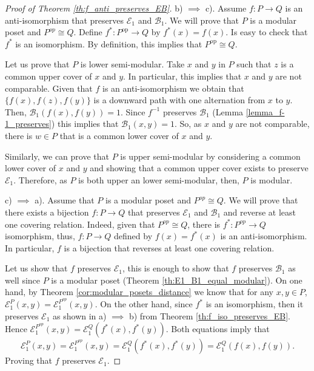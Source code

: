 \documentclass{article}[12pt]
\theoremstyle{exampstyle}
\theoremstyle{remark}
\newcommand{\B}{\mathcal{B}}
\newcommand{\E}{\mathcal{E}}
\newcommand{\op}{\text{op}}
\begin{document}
\begin{proof}[Proof of Theorem \ref{th:f_anti_preserves_EB}]
    b) $\implies$ c). Assume $f: P \to Q $ is an anti-isomorphism that preserves $\E_1$ and $\B_1$.  We will prove that $P$ is a modular poset and $ P^{op} \cong Q$. Define $f^*:  P^{\op} \to Q$ by $f^*(x) = f(x)$. Is easy to check that $f^*$ is an isomorphism. By definition, this implies that $ P^{\op} \cong Q$.
    
    Let us prove that $P$ is lower semi-modular. Take $x$ and $y$ in $P$ such that $z$ is a common upper cover of $x$ and $y$. In particular, this implies that $x$ and $y$ are not comparable. Given that $f$ is an anti-isomorphism we obtain that $\{f(x),f(z),f(y)\}$ is a downward path with one alternation from $x$ to $y$. Then,  $\B_1(f(x),f(y)) = 1$. Since $f^{-1}$ preserves $\B_1$ (Lemma \ref{lemma_f-1_preserves}) this implies that $\B_1(x,y) = 1$. So, as $x$ and $y$ are not comparable, there is $w \in P$ that is a common lower cover of $x$ and $y$.

    Similarly, we can prove that $P$ is upper semi-modular by considering a common lower cover of $x$ and $y$ and showing that a common upper cover exists to preserve $\E_1$. Therefore, as $P$ is both upper an lower semi-modular, then, $P$ is modular.

    c) $\implies$ a). Assume that $P$ is a modular poset and $ P^{op} \cong Q$. We will prove that there exists a bijection $f: P \to Q$ that preserves $\E_1$ and $\B_1$ and reverse at least one covering relation. Indeed, given that $P^{op} \cong Q$, there is $f^*: P^{op} \to Q$ isomorphism, thus, $f: P \to Q$ defined by $f(x) = f^*(x)$ is an anti-isomorphism. In particular, $f$ is a bijection that reverses at least one covering relation. 
    
    Let us show that $f$ preserves $\E_1$, this is enough to show that $f$ preserves $\B_1$ as well since $P$ is a modular poset (Theorem \ref{th:E1_B1_equal_modular}). On one hand, by Theorem \ref{cor:modular_posets_distance} we know that for any $x,y \in P$, $\E_1^P(x,y) = \E_1^{P^{op}}(x,y)$. On the other hand, since $f^*$  is an isomorphism, then it preserves $\E_1$ as shown in a) $\implies$ b) from Theorem \ref{th:f_iso_preserves_EB}. Hence $\E_1^{P^{op}}(x,y) = \E_1^{Q}(f^*(x),f^*(y))$. Both equations imply that
    \begin{equation*}
        \E_1^P(x,y) = \E_1^{P^{op}}(x,y) = \E_1^{Q}(f^*(x),f^*(y)) = \E_1^{Q}(f(x),f(y)).
    \end{equation*}
    Proving that $f$ preserves $\E_1$.

    



    
    
    
\end{proof}
\end{document}
